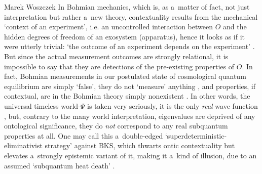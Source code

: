 \begin{artengenv}{Marek Woszczek}
In Bohmian mechanics, which is, as a~matter of fact, not just interpretation but rather a~new theory, contextuality results from the mechanical ‘context of an experiment', i.e. an uncontrolled interaction between $O$ and the hidden degrees of freedom of an exosystem (apparatus), hence it looks as if it were utterly trivial: ‘the outcome of an experiment depends on the experiment'
\parencite[][pp.148–153]{durr_quantum_2013}. %
 But since the actual measurement outcomes are strongly relational, it is impossible to say that they are detections of the pre-existing properties of $O$. In fact, Bohmian measurements in our postulated state of cosmological quantum equilibrium are simply ‘false', they do not ‘measure' anything 
\parencite[][pp.486–488]{valentini_broglie--bohm_2010}, %
 and properties, if contextual, are in the Bohmian theory simply nonexistent 
\parencite[][p.153]{durr_quantum_2013}. %
 In other words, the universal timeless world-$\Psi$ is taken very seriously, it is the only \textit{real} wave function 
\parencite[][pp.264–272]{durr_quantum_2013}, %
 but, contrary to the many world interpretation, eigenvalues are deprived of any ontological significance, they do \textit{not} correspond to any real subquantum properties at all. One may call this a~double-edged ‘superdeterministic-eliminativist strategy' against BKS, which thwarts ontic contextuality but elevates a~strongly epistemic variant of it, making it a~kind of illusion, due to an assumed ‘subquantum heat death' 
\parencite[][]{valentini_broglie--bohm_2010}.%



\end{artengenv}
